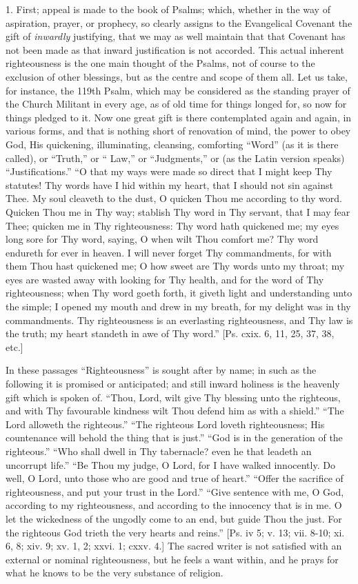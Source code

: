 1. First; appeal is made to the book of Psalms; which, whether in
the way of aspiration, prayer, or prophecy, so clearly assigns to the
Evangelical Covenant the gift of \emph{inwardly} justifying, that we
may as well maintain that that Covenant has not been made as that
inward justification is not accorded. This actual inherent
righteousness is the one main thought of the Psalms, not of course to
the exclusion of other blessings, but as the centre and scope of them
all. Let us take, for instance, the 119th Psalm, which may be
considered as the standing prayer of the Church Militant in every age,
as of old time for things longed for, so now for things pledged to it.
Now one great gift is there contemplated again and again, in various
forms, and that is nothing short of renovation of mind, the power to
obey God, His quickening, illuminating, cleansing, comforting
``Word'' (as it is there called), or ``Truth,'' or
`` Law,'' or ``Judgments,'' or (as the Latin version
speaks) ``Justifications.'' ``O that my ways were made so
direct that I might keep Thy statutes! Thy words have I hid within my
heart, that I should not sin against Thee. My soul cleaveth to the
dust, O quicken Thou me according to thy word. Quicken Thou me in
Thy way; stablish Thy word in Thy servant, that I may fear Thee;
quicken me in Thy righteousness: Thy word hath quickened me; my eyes
long sore for Thy word, saying, O when wilt Thou comfort me? Thy word
endureth for ever in heaven. I will never forget Thy commandments, for
with them Thou hast quickened me; O how sweet are Thy words unto my
throat; my eyes are wasted away with looking for Thy health, and for
the word of Thy righteousness; when Thy word goeth forth, it giveth
light and understanding unto the simple; I opened my mouth and drew in
my breath, for my delight was in thy commandments. Thy righteousness
is an everlasting righteousness, and Thy law is the truth; my heart
standeth in awe of Thy word.'' [Ps. cxix. 6, 11, 25, 37, 38, etc.]

In these passages ``Righteousness'' is sought after by
name; in such as the following it is promised or anticipated; and
still inward holiness is the heavenly gift which is spoken of.
``Thou, Lord, wilt give Thy blessing unto the righteous, and with
Thy favourable kindness wilt Thou defend him as with a shield.''
``The Lord alloweth the righteous.'' ``The righteous Lord
loveth righteousness; His countenance will behold the thing that is
just.'' ``God is in the generation of the righteous.''
``Who shall dwell in Thy tabernacle? even he that leadeth an
uncorrupt life.'' ``Be Thou my judge, O Lord, for I have
walked innocently. Do well, O Lord, unto those who are good and true
of heart.'' ``Offer the sacrifice of righteousness, and put
your trust in the Lord.'' ``Give sentence with me, O God,
according to my righteousness, and according to the innocency
that is in me. O let the wickedness of the ungodly come to an end, but
guide Thou the just. For the righteous God trieth the very hearts and
reins.'' [Ps. iv 5; v. 13; vii. 8-10; xi. 6, 8; xiv. 9; xv. 1, 2;
xxvi. 1; cxxv. 4.] The sacred writer is not satisfied with an external
or nominal righteousness, but he feels a want within, and he prays for
what he knows to be the very substance of religion.

